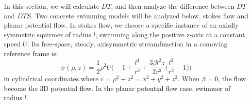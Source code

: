 \documentclass[12pt,a4paper]{article}
\begin{document}
In this section, we will calculate $DT$, and then analyze the
difference between $DT$ and $DTS$. Two concrete swimming models will
be analyzed below, stokes flow and planar potential flow. In stokes
flow, we choose a specific instance of an axially symmetric squirmer
of radius $l$, swimming along the positive z-axis at a constant speed
$U$. Its free-space, steady, axisymmetric streamfunction in a comoving
reference frame is:
\begin{equation}
  \label{eq:9}
  \psi(\rho,z)=\frac{1}{2}\rho^{2}U\bigg(-1+\frac{l^{3}}{r^{3}}+\frac{3\beta
    l^{2}z}{2r^{3}}\bigg(\frac{l^{2}}{r^{2}}-1\bigg)\bigg)
\end{equation}
in cylindrical coordinates where
$r=\rho^{2}+z^{2}=x^{2}+y^{2}+z^{2}$. When $\beta=0$, the flow become the 3D
potential flow. In the planar potential flow case, swimmer of radius $l$
\newpage



\end{document}
